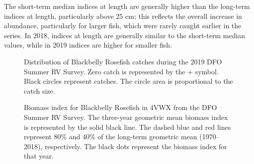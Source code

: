 \documentclass[11pt]{book}
\begin{document}
The short-term median indices at length are generally higher than the long-term indices at length, particularly above 25 cm; this reflects the overall increase in abundance, particularly for larger fish, which were rarely caught earlier in the series. In 2018, indices at length are generally similar to the short-term median values, while in 2019 indices are higher for smaller fish.


\begin{figure}[htb]

{\centering {} 

}

\caption{Distribution of Blackbelly Rosefish catches during the 2019 DFO Summer RV Survey. Zero catch is represented by the + symbol. Black circles represent catches. The circle area is proportional to the catch size.}\label{fig:123-map-bbrosefish}
\end{figure}

\begin{figure}[htb]

{\centering {} 

}

\caption{Biomass index for Blackbelly Rosefish in 4VWX from the DFO Summer RV Survey. The three-year geometric mean biomass index is represented by the solid black line. The dashed blue and red lines represent 80\% and 40\% of the long-term geometric mean (1970--2018), respectively. The black dots represent the biomass index for that year.}\label{fig:124-fig-bbrosefish-biomass}
\end{figure}
\end{document}
